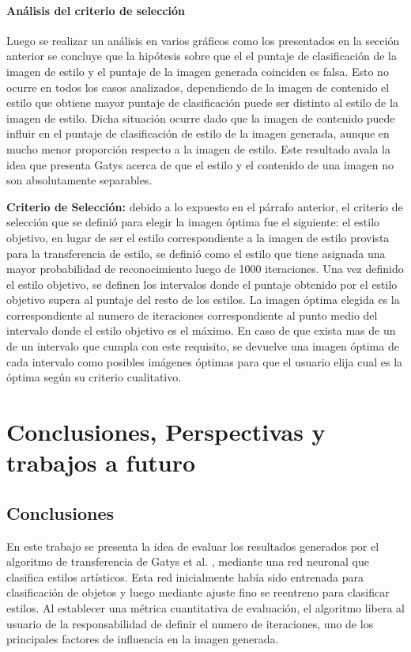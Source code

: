 \documentclass[a4paper,11pt,spanish]{book}
\begin{document}
    \subsubsection{Análisis del criterio de selección} \label{sec:criterio}
      Luego se realizar un análisis en varios gráficos como los presentados en la sección anterior se concluye que la hipótesis sobre que el el puntaje de clasificación de la imagen
      de estilo y el puntaje de la imagen generada coinciden es falsa. Esto no ocurre en todos los casos analizados, dependiendo de la imagen de contenido el estilo
      que obtiene mayor puntaje de clasificación puede ser distinto al estilo de la imagen de estilo. 
      Dicha situación ocurre dado que la imagen de contenido puede influir en el puntaje de clasificación de estilo
      de la imagen generada, aunque en mucho menor proporción respecto a la imagen de estilo. Este resultado avala la idea que presenta Gatys acerca de que el estilo y el contenido de una
      imagen no son absolutamente separables.
      
      \textbf{Criterio de Selección:} debido a lo expuesto en el párrafo anterior, el criterio de selección que se definió para elegir la imagen óptima fue el siguiente: el estilo objetivo, en lugar de ser el estilo correspondiente a la imagen de estilo
      provista para la transferencia de estilo, se definió como el estilo que tiene asignada una mayor probabilidad de reconocimiento luego de 1000 iteraciones. 
      Una vez definido el estilo objetivo, se definen los intervalos donde el puntaje obtenido por el estilo objetivo
      supera al puntaje del resto de los estilos. La imagen óptima elegida es la correspondiente al numero de iteraciones correspondiente al punto medio del intervalo 
      donde el estilo objetivo es el máximo. 
      En caso de que exista mas de un de un intervalo que cumpla con este requisito, se devuelve una imagen óptima de cada intervalo como posibles imágenes óptimas 
      para que el usuario elija cual es la óptima según su criterio cualitativo.


\chapter{Conclusiones, Perspectivas y trabajos a futuro} \label{chap:conclusiones}
  \section{Conclusiones}
    En este trabajo se presenta la idea de evaluar los resultados generados por el algoritmo de transferencia de Gatys et al. \cite{Gatys:Neural_Style}, mediante una red neuronal que 
    clasifica estilos artísticos. Esta red inicialmente había sido entrenada para clasificación de objetos y luego mediante ajuste fino se reentreno para clasificar estilos.
    Al establecer una métrica cuantitativa de evaluación, el algoritmo libera al usuario de la responsabilidad de definir el numero de iteraciones, uno de los principales factores 
    de influencia en la imagen generada.
    
\end{document}
